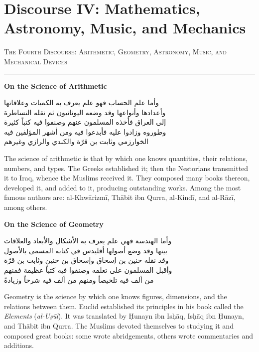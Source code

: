 \documentclass[11pt,a4paper]{article}
\newcommand{\ar}[1]{{\arabicfont\beginR #1\endR}}
\newcommand{\bilingual}[2]{%
  \noindent
  \begin{minipage}[t]{0.47\textwidth}
    \vspace{0pt}
    \begin{flushright}
    {\arabicfont\beginR #1\endR}
    \end{flushright}
  \end{minipage}%
  \hfill\vline\hfill
  \begin{minipage}[t]{0.47\textwidth}
    \vspace{0pt}
    #2
  \end{minipage}%
  \par\vspace{0.8em}
}
\newcommand{\bilingualsection}[2]{%
  \vspace{1em}%
  \noindent
  \begin{minipage}[t]{0.47\textwidth}
    \begin{flushright}
    \textsc{\color{sectioncolor}\ar{#1}}
    \end{flushright}
  \end{minipage}%
  \hfill
  \begin{minipage}[t]{0.47\textwidth}
    \textsc{\color{sectioncolor}#2}
  \end{minipage}%
  \par\vspace{0.5em}\hrule\vspace{0.8em}%
}
\newcommand{\bilingualsubsection}[2]{%
  \vspace{0.6em}%
  \noindent
  \begin{minipage}[t]{0.47\textwidth}
    \begin{flushright}
    \textbf{\color{sectioncolor}\ar{#1}}
    \end{flushright}
  \end{minipage}%
  \hfill
  \begin{minipage}[t]{0.47\textwidth}
    \textbf{\color{sectioncolor}#2}
  \end{minipage}%
  \par\vspace{0.4em}%
}
\begin{document}
\newpage

\section{Discourse IV: Mathematics, Astronomy, Music, and Mechanics}
\label{sec:IV}

\bilingualsection{الفن الرابع في الحساب والهندسة والفلك والموسيقى والحيل}{The Fourth Discourse: Arithmetic, Geometry, Astronomy, Music, and Mechanical Devices}

\bilingualsubsection{في علم الحساب}{On the Science of Arithmetic}

\bilingual
{وأما علم الحساب فهو علم يعرف به الكميات وعلاقاتها\\
وأعدادها وأنواعها وقد وضعه اليونانيون ثم نقله النساطرة\\
إلى العراق فأخذه المسلمون عنهم وصنفوا فيه كتباً كثيرة\\
وطوروه وزادوا عليه فأبدعوا فيه ومن أشهر المؤلفين فيه\\
الخوارزمي وثابت بن قرّة والكندي والرازي وغيرهم}
{The science of arithmetic is that by which one knows quantities, their
relations, numbers, and types. The Greeks established it; then the
Nestorians transmitted it to Iraq, whence the Muslims received it. They
composed many books thereon, developed it, and added to it, producing
outstanding works. Among the most famous authors are: al-Khw\=arizm\=i,
Th\=abit ibn Qurra, al-Kind\=i, and al-R\=az\=i, among others.}

\bilingualsubsection{في علم الهندسة}{On the Science of Geometry}

\bilingual
{وأما الهندسة فهي علم يعرف به الأشكال والأبعاد والعلاقات\\
بينها وقد وضع أصولها أقليدس في كتابه المسمى بالأصول\\
وقد نقله حنين بن إسحاق وإسحاق بن حنين وثابت بن قرّة\\
وأقبل المسلمون على تعلمه وصنفوا فيه كتباً عظيمة فمنهم\\
من ألف فيه تلخيصاً ومنهم من ألف فيه شرحاً وزيادةً}
{Geometry is the science by which one knows figures, dimensions, and the
relations between them. Euclid established its principles in his book
called the \textit{Elements} (\textit{al-U\d{s}\=ul}). It was translated by
\d{H}unayn ibn Is\d{h}\=aq, Is\d{h}\=aq ibn \d{H}unayn, and Th\=abit
ibn Qurra. The Muslims devoted themselves to studying it and composed
great books: some wrote abridgements, others wrote commentaries and
additions.}
\end{document}

